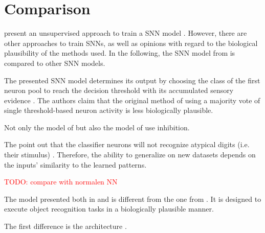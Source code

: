 \section{Comparison}
\label{sec:comparison}

\authorsSNN{} present an unsupervised approach to train a \ac{SNN} model \cite{SNN}.
However, there are other approaches to train \acp{SNN}, as well as opinions with regard to the biological plausibility of the methods used.
In the following, the \ac{SNN} model from \authorsSNN{} \cite{SNN} is compared to other \ac{SNN} models.


The presented \ac{SNN} model determines its output by 
choosing the class of the first neuron pool to reach the decision threshold with its accumulated sensory evidence \cite{STDP_like}.
The authors claim that the original method of using a majority vote of single threshold-based neuron activity is less biologically plausible.

Not only the model of \authorsSTDPlike{} \cite{STDP_like} but also the model of \authorsSNN{} \cite{SNN} use inhibition.

The \authorsSTDPlike{} point out that the classifier neurons will not recognize atypical digits (i.e. their stimulus) \cite{STDP_like}.
Therefore, the ability to generalize on new datasets depends on the inputs' similarity to the learned patterns.


\textcolor{red}{TODO: compare with normalen NN}

The model presented both in \cite{multi_scale_STDP} and \cite{STDP_vis_feat} is different from the one from \authorsSNN{} \cite{SNN}.
It is designed to execute object recognition tasks in a biologically plausible manner.

The first difference is the architecture \cite{multi_scale_STDP,STDP_vis_feat}.

